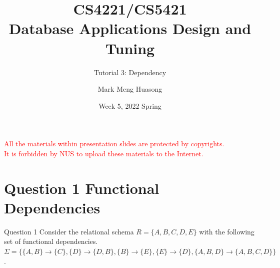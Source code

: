\title{CS4221/CS5421\\Database Applications Design and Tuning}

\subtitle{Tutorial 3: Dependency}

\author{Mark Meng Huasong}



\date{Week 5, 2022 Spring}

\begin{frame}
	\titlepage
	\begin{tcolorbox}
		\begin{center}
			{\scriptsize \textcolor{red}{All the materials within presentation slides are protected by copyrights.\\
					It is forbidden by NUS to upload these materials to the Internet.}}
		\end{center}
	\end{tcolorbox}
\end{frame}


\section*{Question 1 Functional Dependencies}

\begin{frame}[fragile]{Question 1}
Consider the relational schema $R=\{A, B, C, D, E\}$ with the following set of functional dependencies.\\\vspace{5pt}
$\Sigma=\{\{A, B\} \rightarrow \{C\}, \{D\} \rightarrow \{D, B\}, \{B\} \rightarrow \{E\}, \{E\} \rightarrow \{D\}, \{A, B, D\} \rightarrow \{A, B, C, D\}\}$.
\end{frame}


